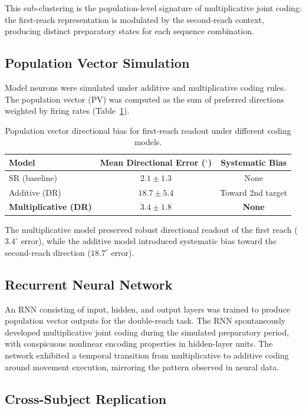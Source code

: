 \documentclass[11pt]{article}
\begin{document}
This sub-clustering is the population-level signature of multiplicative joint coding: the first-reach representation is modulated by the second-reach context, producing distinct preparatory states for each sequence combination.

\subsection{Population Vector Simulation}

Model neurons were simulated under additive and multiplicative coding rules. The population vector (PV) was computed as the sum of preferred directions weighted by firing rates (Table~\ref{tab:pv}).

\begin{table}[H]
\centering
\caption{Population vector directional bias for first-reach readout under different coding models.}
\label{tab:pv}
\begin{tabular}{@{}lcc@{}}
\toprule
Model & Mean Directional Error ($^\circ$) & Systematic Bias \\
\midrule
SR (baseline) & $2.1 \pm 1.3$ & None \\
Additive (DR) & $18.7 \pm 5.4$ & Toward 2nd target \\
\textbf{Multiplicative (DR)} & $\mathbf{3.4 \pm 1.8}$ & \textbf{None} \\
\bottomrule
\end{tabular}
\end{table}

The multiplicative model preserved robust directional readout of the first reach ($3.4^\circ$ error), while the additive model introduced systematic bias toward the second-reach direction ($18.7^\circ$ error).

\subsection{Recurrent Neural Network}

An RNN consisting of input, hidden, and output layers was trained to produce population vector outputs for the double-reach task. The RNN spontaneously developed multiplicative joint coding during the simulated preparatory period, with conspicuous nonlinear encoding properties in hidden-layer units. The network exhibited a temporal transition from multiplicative to additive coding around movement execution, mirroring the pattern observed in neural data.

\subsection{Cross-Subject Replication}
\end{document}
